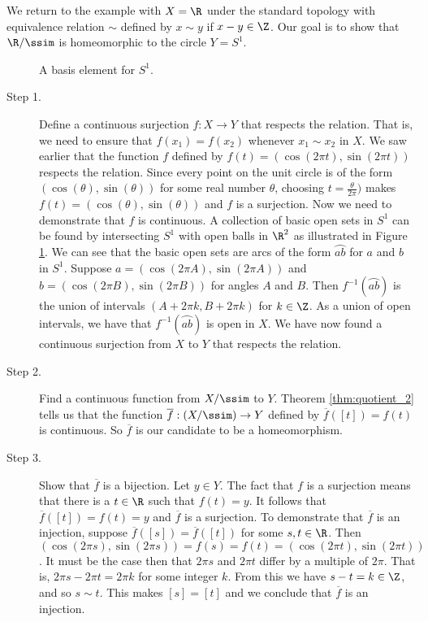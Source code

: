 \begin{example}[Continued.] We return to the example with $X = \R$ under the standard topology with equivalence relation  $\sim$ defined by $x \sim y$ if $x - y \in \Z$. Our goal is to show that $\R/\ssim$ is homeomorphic to the circle $Y = S^1$. 

\begin{figure}[h]
\begin{center}
\caption{A basis element for $S^1$.} 
\label{F:S_1_basis}
\end{center}
\end{figure}


\begin{description}
\item[Step 1.] Define a continuous surjection $f: X \to Y$ that respects the relation. That is, we need to ensure that $f(x_1) = f(x_2)$ whenever $x_1 \sim x_2$ in $X$. We saw earlier that the function $f$ defined by $f(t) = (\cos(2 \pi t), \sin(2 \pi t))$ respects the relation. Since every point on the unit circle is of the form $(\cos(\theta), \sin(\theta))$ for some real number $\theta$, choosing $t = \frac{\theta}{2 \pi})$ makes $f(t) = (\cos(\theta), \sin(\theta))$ and $f$ is a surjection. Now we need to demonstrate that $f$ is continuous. A collection of basic open sets in $S^1$ can be found by intersecting $S^1$ with open balls in $\R^2$ as illustrated in Figure \ref{F:S_1_basis}. We can see that the basic open sets are arcs of the form $\wideparen{ab}$ for $a$ and $b$ in $S^1$. Suppose $a = (\cos(2 \pi A), \sin(2 \pi A))$ and $b = (\cos(2 \pi B), \sin(2 \pi B))$ for angles $A$ and $B$. Then $f^{-1}(\wideparen{ab})$ is the union of intervals $(A+2\pi k, B+2 \pi k)$ for $k \in \Z$. As a union of open intervals, we have that $f^{-1}(\wideparen{ab})$ is open in $X$. We have now found a continuous surjection from $X$ to $Y$ that respects the relation. 

\item[Step 2.] Find a continuous function from $X/\ssim$ to $Y$. Theorem \ref{thm:quotient_2} tells us that the function $\overline{f} : (X/\ssim) \to Y$ defined by $\overline{f}([t]) = f(t)$ is continuous. So $\overline{f}$ is our candidate to be a homeomorphism. 

\item[Step 3.] Show that $\overline{f}$ is a bijection. Let $y \in Y$. The fact that $f$ is a surjection means that there is a $t \in \R$ such that $f(t) = y$. It follows that $\overline{f}([t]) = f(t) = y$ and $\overline{f}$ is a surjection. To demonstrate that $\overline{f}$ is an injection, suppose $\overline{f}([s]) = \overline{f}([t])$ for some $s, t \in \R$.  Then $(\cos(2 \pi s), \sin(2 \pi s)) = f(s) = f(t) = (\cos(2\pi t), \sin(2 \pi t))$. It must be the case then that $2 \pi s$ and $2 \pi t$ differ by a multiple of $2 \pi$. That is, $2 \pi s - 2 \pi t = 2 \pi k$ for some integer $k$. From this we have $s - t = k \in \Z$, and so $s \sim t$. This makes $[s] = [t]$ and we conclude that $\overline{f}$ is an injection. 


\end{description}
\end{example}
